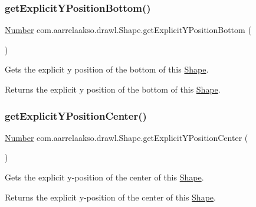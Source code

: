 \subsubsection{\texorpdfstring{get\+Explicit\+Y\+Position\+Bottom()}{getExplicitYPositionBottom()}}
{\footnotesize\ttfamily \hyperlink{interfacecom_1_1aarrelaakso_1_1drawl_1_1_number}{Number} com.\+aarrelaakso.\+drawl.\+Shape.\+get\+Explicit\+Y\+Position\+Bottom (\begin{DoxyParamCaption}{ }\end{DoxyParamCaption})\hspace{0.3cm}{\ttfamily [protected]}}



Gets the explicit y position of the bottom of this \hyperlink{classcom_1_1aarrelaakso_1_1drawl_1_1_shape}{Shape}. 

\begin{DoxyReturn}{Returns}
the explicit y position of the bottom of this \hyperlink{classcom_1_1aarrelaakso_1_1drawl_1_1_shape}{Shape}. 
\end{DoxyReturn}
\mbox{\label{classcom_1_1aarrelaakso_1_1drawl_1_1_shape_a1e46cc626d5f5e1360d9d35d23cc50ea}} 
\subsubsection{\texorpdfstring{get\+Explicit\+Y\+Position\+Center()}{getExplicitYPositionCenter()}}
{\footnotesize\ttfamily \hyperlink{interfacecom_1_1aarrelaakso_1_1drawl_1_1_number}{Number} com.\+aarrelaakso.\+drawl.\+Shape.\+get\+Explicit\+Y\+Position\+Center (\begin{DoxyParamCaption}{ }\end{DoxyParamCaption})\hspace{0.3cm}{\ttfamily [protected]}}



Gets the explicit y-\/position of the center of this \hyperlink{classcom_1_1aarrelaakso_1_1drawl_1_1_shape}{Shape}. 

\begin{DoxyReturn}{Returns}
the explicit y-\/position of the center of this \hyperlink{classcom_1_1aarrelaakso_1_1drawl_1_1_shape}{Shape}. 
\end{DoxyReturn}
\mbox{\label{classcom_1_1aarrelaakso_1_1drawl_1_1_shape_a8c65dff2026744ae10648de3908165e5}} 
